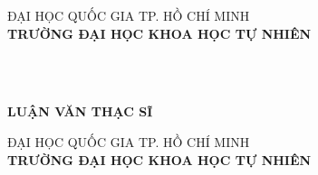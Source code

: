 \begin{titlepage}

\begin{center}
\MakeUppercase{đại học quốc gia tp. hồ chí minh}\\
\MakeUppercase{\bfseries trường đại học khoa học tự nhiên}\\[2cm]


{ \large \bfseries \MakeUppercase{\tenSVTiengViet}\\[2cm] } 


{ \Large \bfseries \MakeUppercase{\tenKLTiengViet} \\[3cm]} 


{\large\bfseries\MakeUppercase{luận văn thạc sĩ}}\\



\vfill
\diachiNgayThang

\end{center}

\pagebreak

\begin{center}
\MakeUppercase{đại học quốc gia tp. hồ chí minh}\\
\MakeUppercase{\bfseries trường đại học khoa học tự nhiên}\\[2cm]


{\large \bfseries \MakeUppercase{\tenSVTiengViet}\\[2cm]} 




\end{center}
\end{titlepage}
